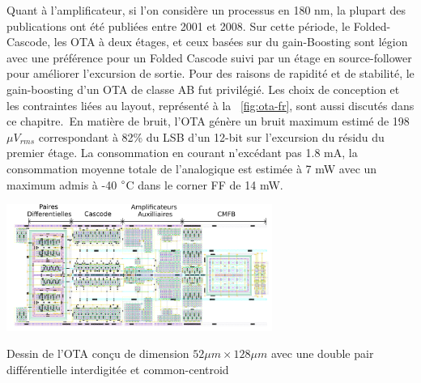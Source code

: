 \begin{mdframed}[linecolor=Prune,linewidth=1]
Quant à l'amplificateur, si l'on considère un processus en 180 nm, la plupart des publications ont été publiées entre 2001 et 2008. Sur cette période, le Folded-Cascode, les OTA à deux étages, et ceux basées sur du gain-Boosting sont légion avec une préférence pour un Folded Cascode suivi par un étage en source-follower pour améliorer l'excursion de sortie. Pour des raisons de rapidité et de stabilité, le gain-boosting d'un OTA de classe AB fut privilégié. Les choix de conception et les contraintes liées au layout, représenté à la \figurename~\ref{fig:ota-fr}, sont aussi discutés dans ce chapitre. En matière de bruit, l'OTA génère un bruit maximum estimé de 198 \(\mu V _{rms} \) correspondant à 82\% du LSB d'un 12-bit sur l'excursion du résidu du premier étage. La consommation en courant n'excédant pas 1.8 mA, la consommation moyenne totale de l'analogique est estimée à 7 mW avec un maximum admis à -40 $\degree$C dans le corner FF de 14 mW.

\begin{center}
    \centering
    \includegraphics[width=0.65\textwidth]{Chapter7/Figs/layout_ota_v2-fr.png}
    \caption[]{Dessin de l'OTA conçu de dimension \(52 \mu m \times 128 \mu m\) avec une double pair différentielle interdigitée et common-centroid}
    \label{fig:ota-fr}
\end{center}


\end{mdframed}
